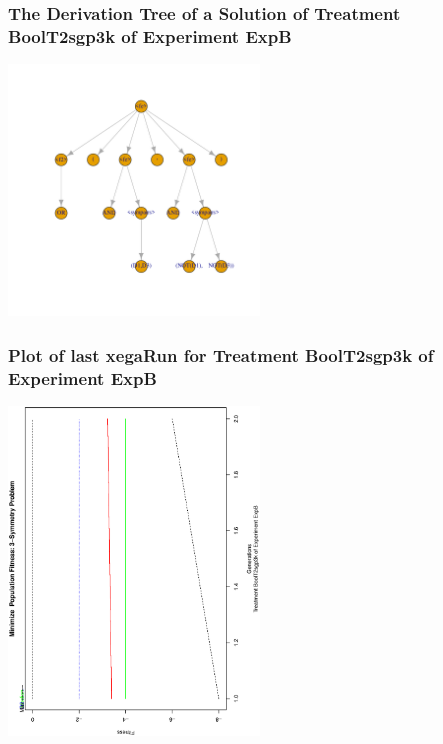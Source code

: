 \documentclass[18pt,c]{beamer}
\begin{document}
 \begin{frame}
 \frametitle{ The Derivation Tree of a Solution of Treatment BoolT2sgp3k of Experiment ExpB }
 \begin{center}
\includegraphics[width=0.5\textwidth, angle=0]
{ExpBDerivationTreeFigure011.pdf}
 \end{center}
 \label{report/ExpBDerivationTreeFigure011.pdf}  
 \end{frame}

 \begin{frame}
 \frametitle{ Plot of last xegaRun for Treatment BoolT2sgp3k of Experiment ExpB }
 \begin{center}
\includegraphics[width=0.5\textwidth, angle=-90]
{ExpBPlotPopStatsFigure011.eps}
 \end{center}
 \label{report/ExpBPlotPopStatsFigure011.eps}  
 \end{frame}
\end{document}
